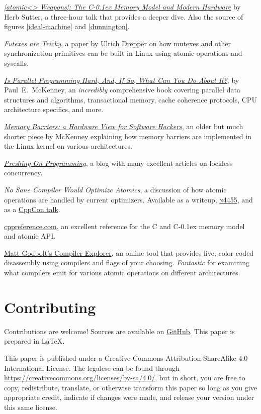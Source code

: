\documentclass[fontsize=10pt, oneside]{scrartcl}
\newcommand{\cplusplus}[1]{C\kern-0.1ex\raisebox{0.15ex}{\texttt{++}}}
\newcommand{\clang}[1]{C}
\begin{document}
\href{https://herbsutter.com/2013/02/11/atomic-weapons-the-c-memory-model-and-modern-hardware/}{%
\textit{\cpp|atomic<> Weapons|: The \cplusplus{11} Memory Model and Modern Hardware}}
by Herb Sutter,
a three-hour talk that provides a deeper dive.
Also the source of figures \ref{ideal-machine} and \ref{dunnington}.

\href{https://www.akkadia.org/drepper/futex.pdf}{\textit{Futexes are Tricky}},
a paper by Ulrich Drepper on how mutexes and other synchronization primitives can be built in Linux using atomic operations and syscalls.

\href{https://www.kernel.org/pub/linux/kernel/people/paulmck/perfbook/perfbook.html}{%
\textit{Is Parallel Programming Hard, And, If So, What Can You Do About It?}},
by Paul~E.\ McKenney,
an \emph{incredibly} comprehensive book covering parallel data structures and
algorithms, transactional memory, cache coherence protocols,
\textsc{CPU} architecture specifics, and more.

\href{http://www.rdrop.com/~paulmck/scalability/paper/whymb.2010.06.07c.pdf}{%
\textit{Memory Barriers: a Hardware View for Software Hackers}},
an older but much shorter piece by McKenney explaining how memory barriers are implemented
in the Linux kernel on various architectures.

\href{https://preshing.com/archives/}{\textit{Preshing On Programming}},
a blog with many excellent articles on lockless concurrency.

\textit{No Sane Compiler Would Optimize Atomics},
a discussion of how atomic operations are handled by current optimizers.
Available as a writeup,
\href{http://www.open-std.org/jtc1/sc22/wg21/docs/papers/2015/n4455.html}{%
\textsc{n}4455}, and as a
\href{https://www.youtube.com/watch?v=IB57wIf9W1k}{CppCon talk}.

\href{https://en.cppreference.com}{cppreference.com},
an excellent reference for the \clang{} and \cplusplus{} memory model and atomic \textsc{API}.

\href{https://godbolt.org/}{Matt Godbolt's Compiler Explorer},
an online tool that provides live, color-coded disassembly using compilers and flags of your choosing.
\emph{Fantastic} for examining what compilers emit for various atomic operations on different architectures.

\section{Contributing}

Contributions are welcome!
Sources are available on
\href{https://github.com/sysprog21/concurrency-primer}{GitHub}.
This paper is prepared in \LaTeX{}.

This paper is published under a
Creative Commons Attribution-ShareAlike 4.0 International License.
The legalese can be found through
\url{https://creativecommons.org/licenses/by-sa/4.0/},
but in short,
you are free to copy, redistribute, translate, or otherwise transform this paper
so long as you give appropriate credit, indicate if changes were made,
and release your version under this same license.
\end{document}
